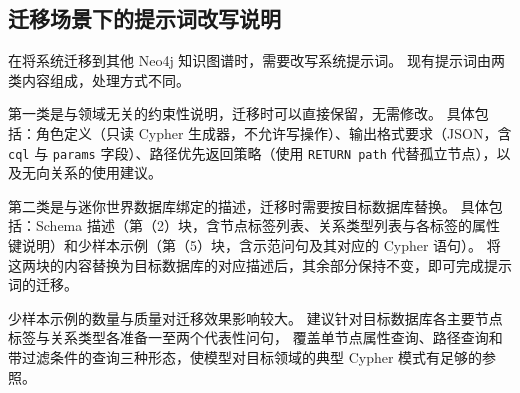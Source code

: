 \subsection{迁移场景下的提示词改写说明}

在将系统迁移到其他 Neo4j 知识图谱时，需要改写系统提示词。
现有提示词由两类内容组成，处理方式不同。

第一类是与领域无关的约束性说明，迁移时可以直接保留，无需修改。
具体包括：角色定义（只读 Cypher 生成器，不允许写操作）、输出格式要求（JSON，含 \texttt{cql} 与 \texttt{params} 字段）、路径优先返回策略（使用 \texttt{RETURN path} 代替孤立节点），以及无向关系的使用建议。

第二类是与迷你世界数据库绑定的描述，迁移时需要按目标数据库替换。
具体包括：Schema 描述（第（2）块，含节点标签列表、关系类型列表与各标签的属性键说明）和少样本示例（第（5）块，含示范问句及其对应的 Cypher 语句）。
将这两块的内容替换为目标数据库的对应描述后，其余部分保持不变，即可完成提示词的迁移。

少样本示例的数量与质量对迁移效果影响较大。
建议针对目标数据库各主要节点标签与关系类型各准备一至两个代表性问句，
覆盖单节点属性查询、路径查询和带过滤条件的查询三种形态，使模型对目标领域的典型 Cypher 模式有足够的参照。
